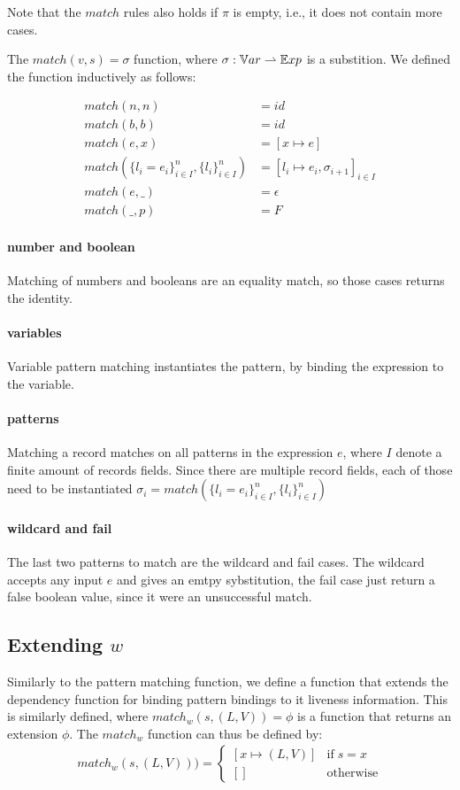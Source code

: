 \documentclass[../../master.tex]{subfiles}
\begin{document}
Note that the $match$ rules also holds if $\pi$ is empty, i.e., it does not contain more cases.

The $match(v,s)=\sigma$ function, where $\sigma:\mathbb{V}ar \rightharpoonup \mathbb{E}xp$ is a substition.
We defined the function inductively as follows:

\begin{align*}
	match(n,n) &= id\\
	match(b,b) &= id\\
	match(e,x) &= [x \mapsto e]\\
	match(\{l_i=e_i\}^n_{i \in I},\{l_i\}^n_{i \in I}) &= [l_i \mapsto e_i, \sigma_{i+1}]_{i \in I}\\
	match(e,\_) &=\epsilon\\
	match(\_,p) &= F
\end{align*}

\paragraph{number and boolean}
Matching of numbers and booleans are an equality match, so those cases returns the identity.

\paragraph{variables}
Variable pattern matching instantiates the pattern, by binding the expression to the variable.

\paragraph{patterns}
Matching a record matches on all patterns in the expression $e$, where $I$ denote a finite amount of records fields.
Since there are multiple record fields, each of those need to be instantiated
$\sigma_i=match(\{l_i=e_i\}^n_{i \in I},\{l_i\}^n_{i \in I})$

\paragraph{wildcard and fail}
The last two patterns to match are the wildcard and fail cases.
The wildcard accepts any input $e$ and gives an emtpy sybstitution, the fail case just return a false boolean value, since it were an unsuccessful match.


\subsection{Extending $w$}
Similarly to the pattern matching function, we define a function that extends the dependency function for binding pattern bindings to it liveness information.
This is similarly defined, where $match_w(s,(L,V))=\phi$ is a function that returns an extension $\phi$.
The $match_w$ function can thus be defined by:
\begin{align}
	match_w(s,(L,V))) =
	\left\{\begin{matrix}
		[x\mapsto (L,V)] & \mbox{if}\; s=x\\ 
		[] & \mbox{otherwise}
	\end{matrix}\right.
\end{align}
\end{document}
